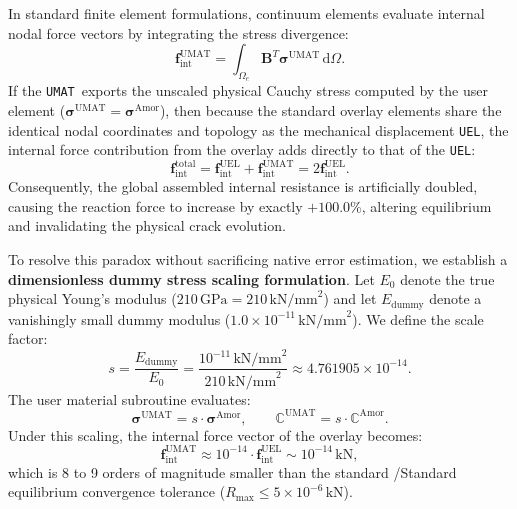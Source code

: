 In standard finite element formulations, continuum elements evaluate internal nodal force vectors by integrating the stress divergence:
\begin{equation}
  \mathbf{f}_{\mathrm{int}}^{\mathrm{UMAT}} = \int_{\Omega_e} \mathbf{B}^T \boldsymbol{\sigma}^{\mathrm{UMAT}} \, \mathrm{d}\Omega.
  \label{eq:f1720_fint_umat}
\end{equation}
If the \texttt{UMAT}\ exports the unscaled physical Cauchy stress computed by the user element ($\boldsymbol{\sigma}^{\mathrm{UMAT}} = \boldsymbol{\sigma}^{\mathrm{Amor}}$), then because the standard overlay elements share the identical nodal coordinates and topology as the mechanical displacement \texttt{UEL}, the internal force contribution from the overlay adds directly to that of the \texttt{UEL}:
\begin{equation}
  \mathbf{f}_{\mathrm{int}}^{\mathrm{total}} = \mathbf{f}_{\mathrm{int}}^{\mathrm{UEL}} + \mathbf{f}_{\mathrm{int}}^{\mathrm{UMAT}} = 2 \mathbf{f}_{\mathrm{int}}^{\mathrm{UEL}}.
  \label{eq:f1720_force_doubling}
\end{equation}
Consequently, the global assembled internal resistance is artificially doubled, causing the reaction force to increase by exactly $+100.0\%$, altering equilibrium and invalidating the physical crack evolution.

To resolve this paradox without sacrificing native error estimation, we establish a \textbf{dimensionless dummy stress scaling formulation}. Let $E_0$ denote the true physical Young's modulus ($210\,\mathrm{GPa} = 210\,\mathrm{kN/mm}^2$) and let $E_{\mathrm{dummy}}$ denote a vanishingly small dummy modulus ($1.0 \times 10^{-11}\,\mathrm{kN/mm}^2$). We define the scale factor:
\begin{equation}
  s = \frac{E_{\mathrm{dummy}}}{E_0} = \frac{10^{-11}\,\mathrm{kN/mm}^2}{210\,\mathrm{kN/mm}^2} \approx 4.761905 \times 10^{-14}.
  \label{eq:f1720_scale_factor}
\end{equation}
The user material subroutine evaluates:
\begin{equation}
  \boldsymbol{\sigma}^{\mathrm{UMAT}} = s \cdot \boldsymbol{\sigma}^{\mathrm{Amor}}, \qquad \mathbb{C}^{\mathrm{UMAT}} = s \cdot \mathbb{C}^{\mathrm{Amor}}.
  \label{eq:f1720_umat_stress}
\end{equation}
Under this scaling, the internal force vector of the overlay becomes:
\begin{equation}
  \mathbf{f}_{\mathrm{int}}^{\mathrm{UMAT}} \approx 10^{-14} \cdot \mathbf{f}_{\mathrm{int}}^{\mathrm{UEL}} \sim 10^{-14}\,\mathrm{kN},
  \label{eq:f1720_fint_neutral}
\end{equation}
which is 8 to 9 orders of magnitude smaller than the standard \Abaqus/Standard equilibrium convergence tolerance ($R_{\max} \le 5 \times 10^{-6}\,\mathrm{kN}$).

